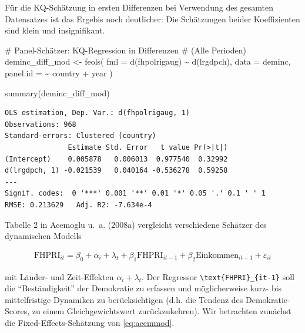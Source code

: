 \documentclass[
  a4paper,
  DIV=11,
  oneside]{scrreprt}
\newenvironment{Shaded}{\begin{snugshade}}{\end{snugshade}}
\newcommand{\AttributeTok}[1]{\textcolor[rgb]{0.40,0.45,0.13}{#1}}
\newcommand{\CommentTok}[1]{\textcolor[rgb]{0.37,0.37,0.37}{#1}}
\newcommand{\FunctionTok}[1]{\textcolor[rgb]{0.28,0.35,0.67}{#1}}
\newcommand{\NormalTok}[1]{\textcolor[rgb]{0.00,0.23,0.31}{#1}}
\newcommand{\OtherTok}[1]{\textcolor[rgb]{0.00,0.23,0.31}{#1}}
\newcommand{\SpecialCharTok}[1]{\textcolor[rgb]{0.37,0.37,0.37}{#1}}
\begin{document}
Für die KQ-Schätzung in ersten Differenzen bei Verwendung des gesamten
Datensatzes ist das Ergebis noch deutlicher: Die Schätzungen beider
Koeffizienten sind klein und insignifikant.

\begin{Shaded}
\begin{Highlighting}[]
\CommentTok{\# Panel{-}Schätzer: KQ{-}Regression in Differenzen}
\CommentTok{\# (Alle Perioden)}
\NormalTok{deminc\_diff\_mod }\OtherTok{\textless{}{-}} \FunctionTok{feols}\NormalTok{(}
  \AttributeTok{fml =} \FunctionTok{d}\NormalTok{(fhpolrigaug) }\SpecialCharTok{\textasciitilde{}} \FunctionTok{d}\NormalTok{(lrgdpch), }
  \AttributeTok{data =}\NormalTok{ deminc,}
  \AttributeTok{panel.id =} \SpecialCharTok{\textasciitilde{}}\NormalTok{ country }\SpecialCharTok{+}\NormalTok{ year}
\NormalTok{)}

\FunctionTok{summary}\NormalTok{(deminc\_diff\_mod)}
\end{Highlighting}
\end{Shaded}

\begin{verbatim}
OLS estimation, Dep. Var.: d(fhpolrigaug, 1)
Observations: 968
Standard-errors: Clustered (country) 
               Estimate Std. Error   t value Pr(>|t|) 
(Intercept)    0.005878   0.006013  0.977540  0.32992 
d(lrgdpch, 1) -0.021539   0.040164 -0.536278  0.59258 
---
Signif. codes:  0 '***' 0.001 '**' 0.01 '*' 0.05 '.' 0.1 ' ' 1
RMSE: 0.213629   Adj. R2: -7.634e-4
\end{verbatim}

Tabelle 2 in Acemoglu u.~a. (2008a) vergleicht verschiedene Schätzer des
dynamischen Modells

\begin{align}
  \text{FHPRI}_{it} = \beta_0 + \alpha_i + \lambda_t + \beta_1 \text{FHPRI}_{it-1} + \beta_2 \text{Einkommen}_{it-1}  + \varepsilon_{it}\label{eq:acemmod}
\end{align}

mit Länder- und Zeit-Effekten \(\alpha_i + \lambda_t\). Der Regressor
\texttt{\textbackslash{}text\{FHPRI\}\_\{it-1\}} soll die
``Beständigkeit'' der Demokratie zu erfassen und möglicherweise kurz-
bis mittelfristige Dynamiken zu berücksichtigen (d.h. die Tendenz des
Demokratie-Scores, zu einem Gleichgewichtswert zurückzukehren). Wir
betrachten zunächst die Fixed-Effects-Schätzung von \eqref{eq:acemmod}.
\end{document}
